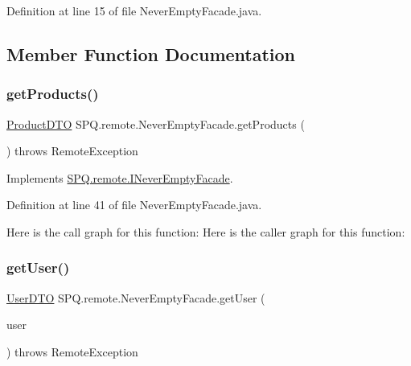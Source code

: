 Definition at line 15 of file Never\+Empty\+Facade.\+java.



\subsection{Member Function Documentation}
\mbox{\label{class_s_p_q_1_1remote_1_1_never_empty_facade_a4c8bdeeb3d2c3eb2c28aec1043e9274f}} 
\subsubsection{\texorpdfstring{get\+Products()}{getProducts()}}
{\footnotesize\ttfamily \mbox{\hyperlink{class_s_p_q_1_1dto_1_1_product_d_t_o}{Product\+D\+TO}} S\+P\+Q.\+remote.\+Never\+Empty\+Facade.\+get\+Products (\begin{DoxyParamCaption}{ }\end{DoxyParamCaption}) throws Remote\+Exception}



Implements \mbox{\hyperlink{interface_s_p_q_1_1remote_1_1_i_never_empty_facade_a62d4a1747b8ba90f451fc9f9343055f3}{S\+P\+Q.\+remote.\+I\+Never\+Empty\+Facade}}.



Definition at line 41 of file Never\+Empty\+Facade.\+java.

Here is the call graph for this function\+:
Here is the caller graph for this function\+:
\mbox{\label{class_s_p_q_1_1remote_1_1_never_empty_facade_a32679a25e12c8a33e84087de357cd616}} 
\subsubsection{\texorpdfstring{get\+User()}{getUser()}}
{\footnotesize\ttfamily \mbox{\hyperlink{class_s_p_q_1_1dto_1_1_user_d_t_o}{User\+D\+TO}} S\+P\+Q.\+remote.\+Never\+Empty\+Facade.\+get\+User (\begin{DoxyParamCaption}\item[{\mbox{\hyperlink{class_s_p_q_1_1dto_1_1_user_d_t_o}{User\+D\+TO}}}]{user }\end{DoxyParamCaption}) throws Remote\+Exception}



